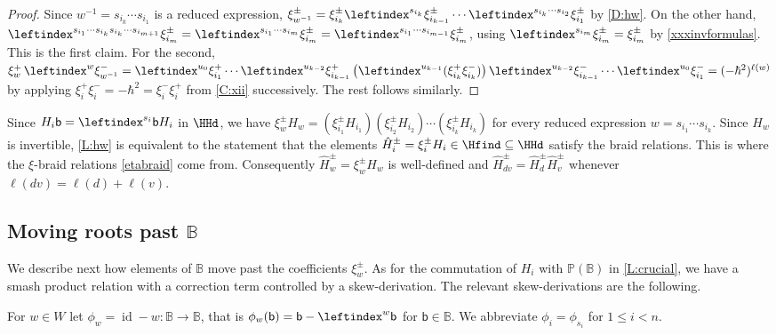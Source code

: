 \documentclass[a4paper,11pt]{amsart}
\numberwithin{equation}{subsection}
\theoremstyle{definition}
\theoremstyle{theorem}
\theoremstyle{remark}
\newcommand\Sym{W}
\newcommand\xipm{\xi^\pm}
\newcommand\bb{\mathsf{b}}
\newcommand\op{\operatorname}
\newcommand\Po{\mathbb{P}(\mathbb{B})}
\newcommand{\Bo}{\mathbb{B}}
\begin{document}
 \begin{proof}
   Since $w^{-1}=s_{i_k}\cdots s_{i_1}$ is a reduced expression,
   $\xipm_{w^{-1}}=\xipm_{i_k}\leftindex^{s_{i_k}}{{\xipm_{i_{k-1}}}}\cdots
   \leftindex^{s_{i_k}\cdots s_{i_2}}{{\xipm_{i_1}}}$ by \autoref{D:hw}. On the other hand,
   $\leftindex^{s_{i_1}\cdots s_{i_k}s_{i_k}\cdots s_{i_{m+1}}}{{\xipm_{i_m}}}
   =\leftindex^{s_{i_1}\cdots s_{i_m}}{{\xipm_{i_m}}}
   =\leftindex^{s_{i_1}\cdots s_{i_{m-1}}}{{\xipm_{i_m}}}$, using
   $\leftindex^{s_{i_m}}{{\xipm_{i_m}}}=\xipm_{i_m}$ by \autoref{xxxinvformulas}. This is the first claim.
   For the second,
   $\xi^+_w\,\leftindex^w{{\xi^-_{w^{-1}}}}
      =\leftindex^{u_0}{{\xi^+_{i_1}}}\cdots\leftindex^{u_{k-2}}{{\xi^+_{i_{k-1}}}}
        \left(\leftindex^{u_{k-1}}{(\xi^+_{i_k}\xi^-_{i_k})}\right)
        \leftindex^{u_{k-2}}{{\xi^-_{i_{k-1}}}}\cdots\leftindex^{u_0}{{\xi^-_{i_1}}}=(-\hbar^2)^{\ell(w)}$ by applying  $\xi^+_i\xi^-_i=-\hbar^2=\xi^-_i\xi^+_i$ from
   \autoref{C:xii} successively. The rest follows similarly.
 \end{proof}



\begin{Remark}\label{R:GH}
  Since $H_i\bb=\leftindex^{s_i}\bb H_i$ in $\HHd$, we have
  $\xipm_wH_w=(\xipm_{i_1}H_{i_1})(\xipm_{i_2}H_{i_2})\cdots(\xipm_{i_k}H_{i_k})$
  for every reduced expression $w=s_{i_1}\cdots s_{i_k}$. Since
  $H_w$ is invertible, \autoref{L:hw} is equivalent to the statement
  that the elements $\hat{H}^\pm_i=\xipm_iH_i\in\Hfind\subseteq\HHd$ satisfy the braid
  relations. This is where the $\xi$-braid relations \autoref{etabraid} come from. Consequently
  $\hat{H}^\pm_w=\xipm_wH_w$ is well-defined and
  $\hat{H}^\pm_{dv}=\hat{H}^\pm_d\hat{H}^\pm_v$ whenever $\ell(dv)=\ell(d)+\ell(v)$.
  \end{Remark}
\subsection{Moving roots past $\Bo$}
 We describe next how elements of $\Bo$ move past the coefficients $\xipm_w$. As for the commutation of $H_i$ with $\Po$ in \autoref{L:crucial}, we have a smash product relation with a correction term controlled by a skew-derivation. The relevant skew-derivations are the following.

\begin{Definition}\label{D:phi}
  For $w\in\Sym$ let $\phi_w=\op{id}-w\colon\Bo\to\Bo$, that is
  $\phi_w(\bb)=\bb-\leftindex^w\bb$ for $\bb\in\Bo$. We abbreviate $\phi_i=\phi_{s_i}$ for $1\le i<n$.
\end{Definition}
\end{document}
